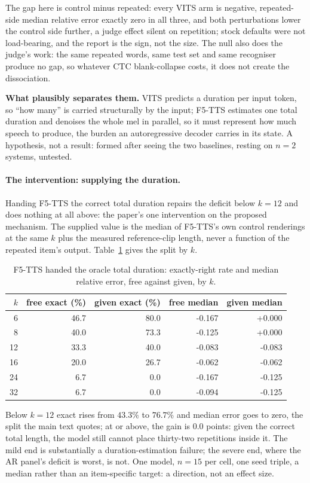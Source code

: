 \noindent The gap here is control minus repeated: every VITS arm is
negative, repeated-side median relative error exactly zero in all
three, and both perturbations lower the control side further, a judge
effect silent on repetition; stock defaults were not load-bearing, and
the report is the sign, not the size. The null also does the judge's
work: the same repeated words, same test set and same recogniser
produce no gap, so whatever CTC blank-collapse costs, it does not
create the dissociation.

\noindent\textbf{What plausibly separates them.} VITS predicts a
duration per input token, so ``how many'' is carried structurally by
the input; F5-TTS estimates one total duration and denoises the whole
mel in parallel, so it must represent how much speech to produce, the
burden an autoregressive decoder carries in its state. A hypothesis,
not a result: formed after seeing the two baselines, resting on $n=2$
systems, untested.

\paragraph{The intervention: supplying the duration.} Handing F5-TTS
the correct total duration repairs the deficit below $k=12$ and does
nothing at all above: the paper's one intervention on the proposed
mechanism. The supplied value is the median of F5-TTS's own control
renderings at the same $k$ plus the measured reference-clip length,
never a function of the repeated item's output. Table~\ref{tab:f5oracle}
gives the split by $k$.

\begin{table}[tp]\centering
\caption{F5-TTS handed the oracle total duration: exactly-right rate and median relative error, free against given, by $k$.}
\label{tab:f5oracle}
\begin{tabular}{rrrrr}
\toprule
$k$ & free exact (\%) & given exact (\%) & free median & given median \\
\midrule
6 & 46.7 & 80.0 & -0.167 & +0.000 \\
8 & 40.0 & 73.3 & -0.125 & +0.000 \\
12 & 33.3 & 40.0 & -0.083 & -0.083 \\
16 & 20.0 & 26.7 & -0.062 & -0.062 \\
24 & 6.7 & 0.0 & -0.167 & -0.125 \\
32 & 6.7 & 0.0 & -0.094 & -0.125 \\
\bottomrule
\end{tabular}
\end{table}

Below $k=12$ exact rises from $43.3\%$ to $76.7\%$ and median error
goes to zero, the split the main text quotes; at or above, the gain is
$0.0$ points: given the correct total length, the model still cannot
place thirty-two repetitions inside it. The mild end is substantially
a duration-estimation failure; the severe end, where the AR panel's
deficit is worst, is not. One model, $n=15$ per cell, one seed triple,
a median rather than an item-specific target: a direction, not an
effect size.

